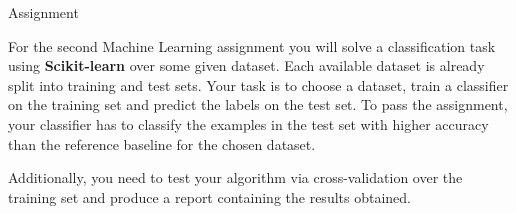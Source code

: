 \documentclass{beamer}
\begin{document}

\begin{frame}{Assignment}
\centering

For the second Machine Learning assignment you will solve a classification task
using \textbf{Scikit-learn} over some given dataset. Each available dataset is
already split into training and test sets. Your task is to
choose a dataset, train a classifier on the training set and predict the labels
on the test set. To pass the assignment, your classifier has to classify the
examples in the test set with higher accuracy than the reference baseline for
the chosen dataset.

Additionally, you need to test your algorithm via cross-validation over the
training set and produce a report containing the results obtained.

\end{frame}

\end{document}
